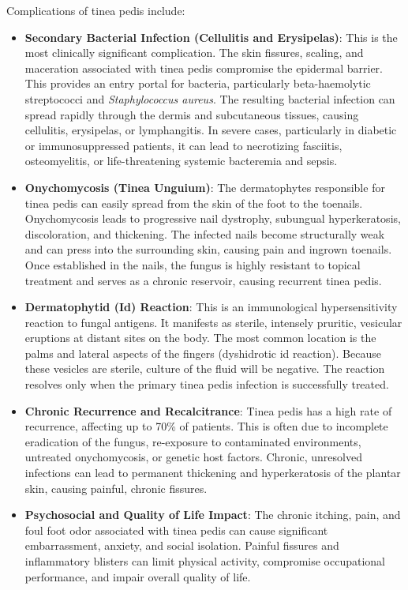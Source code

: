 Complications of tinea pedis include:
\begin{itemize}
    \item \textbf{Secondary Bacterial Infection (Cellulitis and Erysipelas)}: This is the most clinically significant complication. The skin fissures, scaling, and maceration associated with tinea pedis compromise the epidermal barrier. This provides an entry portal for bacteria, particularly beta-haemolytic streptococci and \textit{Staphylococcus aureus}. The resulting bacterial infection can spread rapidly through the dermis and subcutaneous tissues, causing cellulitis, erysipelas, or lymphangitis. In severe cases, particularly in diabetic or immunosuppressed patients, it can lead to necrotizing fasciitis, osteomyelitis, or life-threatening systemic bacteremia and sepsis.
    \item \textbf{Onychomycosis (Tinea Unguium)}: The dermatophytes responsible for tinea pedis can easily spread from the skin of the foot to the toenails. Onychomycosis leads to progressive nail dystrophy, subungual hyperkeratosis, discoloration, and thickening. The infected nails become structurally weak and can press into the surrounding skin, causing pain and ingrown toenails. Once established in the nails, the fungus is highly resistant to topical treatment and serves as a chronic reservoir, causing recurrent tinea pedis.
    \item \textbf{Dermatophytid (Id) Reaction}: This is an immunological hypersensitivity reaction to fungal antigens. It manifests as sterile, intensely pruritic, vesicular eruptions at distant sites on the body. The most common location is the palms and lateral aspects of the fingers (dyshidrotic id reaction). Because these vesicles are sterile, culture of the fluid will be negative. The reaction resolves only when the primary tinea pedis infection is successfully treated.
    \item \textbf{Chronic Recurrence and Recalcitrance}: Tinea pedis has a high rate of recurrence, affecting up to 70\% of patients. This is often due to incomplete eradication of the fungus, re-exposure to contaminated environments, untreated onychomycosis, or genetic host factors. Chronic, unresolved infections can lead to permanent thickening and hyperkeratosis of the plantar skin, causing painful, chronic fissures.
    \item \textbf{Psychosocial and Quality of Life Impact}: The chronic itching, pain, and foul foot odor associated with tinea pedis can cause significant embarrassment, anxiety, and social isolation. Painful fissures and inflammatory blisters can limit physical activity, compromise occupational performance, and impair overall quality of life.
\end{itemize}

